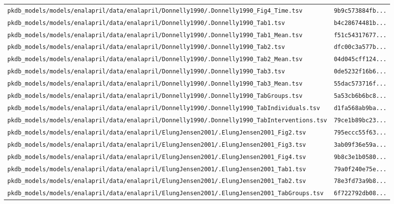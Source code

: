 \documentclass{article}
\begin{document}
\begin{longtable}{ll}
\texttt{pkdb\_models/models/enalapril/data/enalapril/Donnelly1990/.Donnelly1990\_Fig4\_Time.tsv} & \texttt{9b9c573884fb...} \\
\texttt{pkdb\_models/models/enalapril/data/enalapril/Donnelly1990/.Donnelly1990\_Tab1.tsv} & \texttt{b4c28674481b...} \\
\texttt{pkdb\_models/models/enalapril/data/enalapril/Donnelly1990/.Donnelly1990\_Tab1\_Mean.tsv} & \texttt{f51c54317677...} \\
\texttt{pkdb\_models/models/enalapril/data/enalapril/Donnelly1990/.Donnelly1990\_Tab2.tsv} & \texttt{dfc00c3a577b...} \\
\texttt{pkdb\_models/models/enalapril/data/enalapril/Donnelly1990/.Donnelly1990\_Tab2\_Mean.tsv} & \texttt{04d045cff124...} \\
\texttt{pkdb\_models/models/enalapril/data/enalapril/Donnelly1990/.Donnelly1990\_Tab3.tsv} & \texttt{0de5232f16b6...} \\
\texttt{pkdb\_models/models/enalapril/data/enalapril/Donnelly1990/.Donnelly1990\_Tab3\_Mean.tsv} & \texttt{55dac573716f...} \\
\texttt{pkdb\_models/models/enalapril/data/enalapril/Donnelly1990/.Donnelly1990\_TabGroups.tsv} & \texttt{5a53cb6b6bc8...} \\
\texttt{pkdb\_models/models/enalapril/data/enalapril/Donnelly1990/.Donnelly1990\_TabIndividuals.tsv} & \texttt{d1fa568ab9ba...} \\
\texttt{pkdb\_models/models/enalapril/data/enalapril/Donnelly1990/.Donnelly1990\_TabInterventions.tsv} & \texttt{79ce1b89bc23...} \\
\texttt{pkdb\_models/models/enalapril/data/enalapril/ElungJensen2001/.ElungJensen2001\_Fig2.tsv} & \texttt{795eccc55f63...} \\
\texttt{pkdb\_models/models/enalapril/data/enalapril/ElungJensen2001/.ElungJensen2001\_Fig3.tsv} & \texttt{3ab09f36e59a...} \\
\texttt{pkdb\_models/models/enalapril/data/enalapril/ElungJensen2001/.ElungJensen2001\_Fig4.tsv} & \texttt{9b8c3e1b0580...} \\
\texttt{pkdb\_models/models/enalapril/data/enalapril/ElungJensen2001/.ElungJensen2001\_Tab1.tsv} & \texttt{79a0f240e75e...} \\
\texttt{pkdb\_models/models/enalapril/data/enalapril/ElungJensen2001/.ElungJensen2001\_Tab2.tsv} & \texttt{78e3fd73a9b8...} \\
\texttt{pkdb\_models/models/enalapril/data/enalapril/ElungJensen2001/.ElungJensen2001\_TabGroups.tsv} & \texttt{6f722792db08...} \\

\end{longtable}
\end{document}
